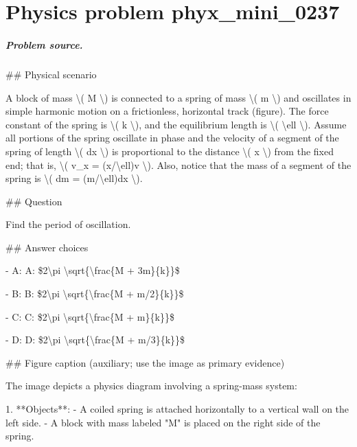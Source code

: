 
\chapter{Physics problem phyx\_mini\_0237}
\label{ch:PhyXMiniProblems_problem_phyx_mini_0237}

\paragraph{Problem source.}
\#\# Physical scenario

A block of mass \textbackslash{}( M \textbackslash{}) is connected to a spring of mass \textbackslash{}( m \textbackslash{}) and oscillates in simple harmonic motion on a frictionless, horizontal track (figure). The force constant of the spring is \textbackslash{}( k \textbackslash{}), and the equilibrium length is \textbackslash{}( \textbackslash{}ell \textbackslash{}). Assume all portions of the spring oscillate in phase and the velocity of a segment of the spring of length \textbackslash{}( dx \textbackslash{}) is proportional to the distance \textbackslash{}( x \textbackslash{}) from the fixed end; that is, \textbackslash{}( v\_x = (x/\textbackslash{}ell)v \textbackslash{}). Also, notice that the mass of a segment of the spring is \textbackslash{}( dm = (m/\textbackslash{}ell)dx \textbackslash{}).

\#\# Question

Find the period of oscillation.

\#\# Answer choices

- A: A: \$2\textbackslash{}pi \textbackslash{}sqrt\{\textbackslash{}frac\{M + 3m\}\{k\}\}\$

- B: B: \$2\textbackslash{}pi \textbackslash{}sqrt\{\textbackslash{}frac\{M + m/2\}\{k\}\}\$

- C: C: \$2\textbackslash{}pi \textbackslash{}sqrt\{\textbackslash{}frac\{M + m\}\{k\}\}\$

- D: D: \$2\textbackslash{}pi \textbackslash{}sqrt\{\textbackslash{}frac\{M + m/3\}\{k\}\}\$

\#\# Figure caption (auxiliary; use the image as primary evidence)

The image depicts a physics diagram involving a spring-mass system:

1. **Objects**:
   - A coiled spring is attached horizontally to a vertical wall on the left side.
   - A block with mass labeled "M" is placed on the right side of the spring.

